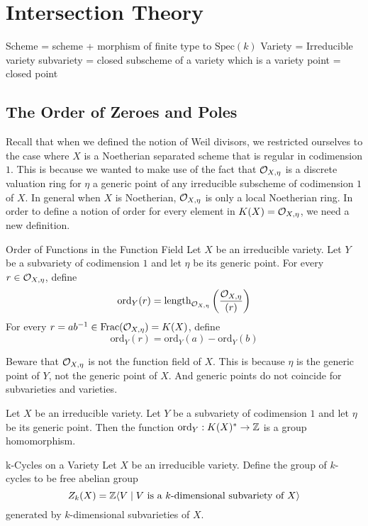 \documentclass[a4paper]{article}
\begin{document}
\pagebreak
\section{Intersection Theory}
Scheme = scheme + morphism of finite type to $\text{Spec}(k)$
Variety = Irreducible variety
subvariety = closed subscheme of a variety which is a variety
point = closed point

\subsection{The Order of Zeroes and Poles}
Recall that when we defined the notion of Weil divisors, we restricted ourselves to the case where $X$ is a Noetherian separated scheme that is regular in codimension $1$. This is because we wanted to make use of the fact that $\mathcal{O}_{X,\eta}$ is a discrete valuation ring for $\eta$ a generic point of any irreducible subscheme of codimension $1$ of $X$. In general when $X$ is Noetherian, $\mathcal{O}_{X,\eta}$ is only a local Noetherian ring. In order to define a notion of order for every element in $K(X)=\mathcal{O}_{X,\eta}$, we need a new definition. 

\begin{defn}{Order of Functions in the Function Field}{} Let $X$ be an irreducible variety. Let $Y$ be a subvariety of codimension $1$ and let $\eta$ be its generic point. For every $r\in\mathcal{O}_{X,\eta}$, define $$\text{ord}_Y(r)=\text{length}_{\mathcal{O}_{X,\eta}}\left(\frac{\mathcal{O}_{X,\eta}}{(r)}\right)$$ For every $r=ab^{-1}\in\text{Frac}(\mathcal{O}_{X,\eta})=K(X)$, define $$\text{ord}_Y(r)=\text{ord}_Y(a)-\text{ord}_Y(b)$$
\end{defn}

Beware that $\mathcal{O}_{X,\eta}$ is not the function field of $X$. This is because $\eta$ is the generic point of $Y$, not the generic point of $X$. And generic points do not coincide for subvarieties and varieties. 

\begin{lmm}{}{} Let $X$ be an irreducible variety. Let $Y$ be a subvariety of codimension $1$ and let $\eta$ be its generic point. Then the function $\text{ord}_Y:K(X)^\ast\to\mathbb{Z}$ is a group homomorphism. 
\end{lmm}

\begin{defn}{k-Cycles on a Variety}{} Let $X$ be an irreducible variety. Define the group of $k$-cycles to be free abelian group $$Z_k(X)=\mathbb{Z}\langle V\;|\;V\text{ is a }k\text{-dimensional subvariety of }X\rangle$$ generated by $k$-dimensional subvarieties of $X$. 
\end{defn}
\end{document}

